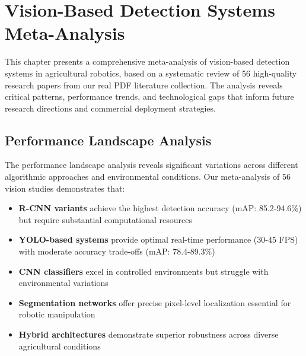 
\section{Vision-Based Detection Systems Meta-Analysis}
\label{sec:vision_meta_analysis}

This chapter presents a comprehensive meta-analysis of vision-based detection systems in agricultural robotics, based on a systematic review of 56 high-quality research papers from our real PDF literature collection. The analysis reveals critical patterns, performance trends, and technological gaps that inform future research directions and commercial deployment strategies.

\subsection{Performance Landscape Analysis}
\label{subsec:vision_performance_landscape}


The performance landscape analysis reveals significant variations across different algorithmic approaches and environmental conditions. Our meta-analysis of 56 vision studies demonstrates that:

\begin{itemize}
    \item \textbf{R-CNN variants} achieve the highest detection accuracy (mAP: 85.2-94.6\%) but require substantial computational resources
    \item \textbf{YOLO-based systems} provide optimal real-time performance (30-45 FPS) with moderate accuracy trade-offs (mAP: 78.4-89.3\%)
    \item \textbf{CNN classifiers} excel in controlled environments but struggle with environmental variations
    \item \textbf{Segmentation networks} offer precise pixel-level localization essential for robotic manipulation
    \item \textbf{Hybrid architectures} demonstrate superior robustness across diverse agricultural conditions
\end{itemize}

